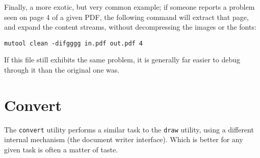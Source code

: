 \documentclass[oneside]{book}
\begin{document}
Finally, a more exotic, but very common example; if someone reports a problem seen on page 4 of a given PDF, the following command will extract that page, and expand the content streams, without decompressing the images or the fonts: 

\begin{lstlisting}
mutool clean -difgggg in.pdf out.pdf 4
\end{lstlisting}

If this file still exhibits the same problem, it is generally far easier to debug through it than the original one was.

\section{Convert}

The \texttt{convert} utility performs a similar task to the \texttt{draw} utility, using a different internal mechanism (the document writer interface). Which is better for any given task is often a matter of taste.  
\end{document}
